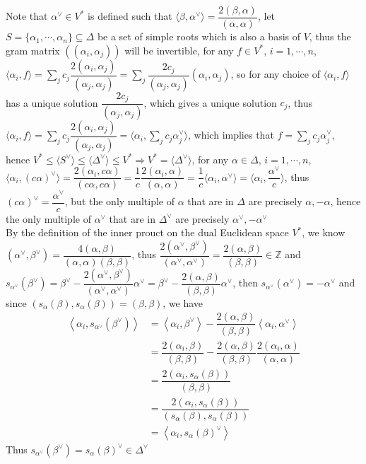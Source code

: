 \documentclass[main]{subfiles}
\begin{document}
Note that $\alpha^\vee\in V^*$ is defined such that $\langle\beta,\alpha^\vee\rangle=\dfrac{2(\beta,\alpha)}{(\alpha,\alpha)}$, let $S=\{\alpha_1,\cdots,\alpha_n\}\subseteq\Delta$ be a set of simple roots which is also a basis of $V$, thus the gram matrix $((\alpha_i,\alpha_j))$ will be invertible, for any $f\in V^*$, $i=1,\cdots,n$, $\langle\alpha_i,f\rangle=\displaystyle\sum_{j}c_j\dfrac{2(\alpha_i,\alpha_j)}{(\alpha_j,\alpha_j)}=\sum_{j}\dfrac{2c_j}{(\alpha_j,\alpha_j)}(\alpha_i,\alpha_j)$, so for any choice of $\langle\alpha_i,f\rangle$ has a unique solution $\dfrac{2c_j}{(\alpha_j,\alpha_j)}$, which gives a unique solution $c_j$, thus $\langle\alpha_i,f\rangle=\displaystyle\sum_{j}c_j\dfrac{2(\alpha_i,\alpha_j)}{(\alpha_j,\alpha_j)}=\langle\alpha_i,\sum_jc_j\alpha_j^\vee\rangle$, which implies that $f=\displaystyle\sum_jc_j\alpha_j^\vee$, hence $V^*\leq\langle S^\vee\rangle\leq\langle \Delta^\vee\rangle\leq V^*\Rightarrow V^*=\langle \Delta^\vee\rangle$, for any $\alpha\in\Delta$, $i=1,\cdots,n$, $\langle\alpha_i,(c\alpha)^\vee\rangle=\dfrac{2(\alpha_i,c\alpha)}{(c\alpha,c\alpha)}=\dfrac{1}{c}\dfrac{2(\alpha_i,\alpha)}{(\alpha,\alpha)}=\dfrac{1}{c}\langle\alpha_i,\alpha^\vee\rangle=\langle\alpha_i,\dfrac{\alpha^\vee}{c}\rangle$, thus $(c\alpha)^\vee=\dfrac{\alpha^\vee}{c}$, but the only multiple of $\alpha$ that are in $\Delta$ are precisely $\alpha,-\alpha$, hence the only multiple of $\alpha^\vee$ that are in $\Delta^\vee$ are precisely $\alpha^\vee,-\alpha^\vee$ \\
By the definition of the inner prouct on the dual Euclidean space $V^*$, we know $(\alpha^\vee,\beta^\vee)=\dfrac{4(\alpha,\beta)}{(\alpha,\alpha)(\beta,\beta)}$, thus $\dfrac{2(\alpha^\vee,\beta^\vee)}{(\alpha^\vee,\alpha^\vee)}=\dfrac{2(\alpha,\beta)}{(\beta,\beta)}\in\mathbb Z$ and $s_{\alpha^\vee}(\beta^\vee)=\beta^\vee-\dfrac{2(\alpha^\vee,\beta^\vee)}{(\alpha^\vee,\alpha^\vee)}\alpha^\vee=\beta^\vee-\dfrac{2(\alpha,\beta)}{(\beta,\beta)}\alpha^\vee$, then $s_{\alpha^\vee}(\alpha^\vee)=-\alpha^\vee$ and since $(s_\alpha(\beta),s_\alpha(\beta))=(\beta,\beta)$, we have\begin{align*}
\left\langle\alpha_i,s_{\alpha^\vee}(\beta^\vee)\right\rangle&=\left\langle\alpha_i,\beta^\vee\right\rangle-\dfrac{2(\alpha,\beta)}{(\beta,\beta)}\left\langle\alpha_i,\alpha^\vee\right\rangle \\
&=\dfrac{2(\alpha_i,\beta)}{(\beta,\beta)}-\dfrac{2(\alpha,\beta)}{(\beta,\beta)}\dfrac{2(\alpha_i,\alpha)}{(\alpha,\alpha)} \\
&=\dfrac{2(\alpha_i,s_\alpha(\beta))}{(\beta,\beta)} \\
&=\dfrac{2(\alpha_i,s_\alpha(\beta))}{(s_\alpha(\beta),s_\alpha(\beta))} \\
&=\left\langle\alpha_i,s_\alpha(\beta)^\vee\right\rangle
\end{align*}Thus $s_{\alpha^\vee}(\beta^\vee)=s_\alpha(\beta)^\vee\in\Delta^\vee$ \par
\end{document}
